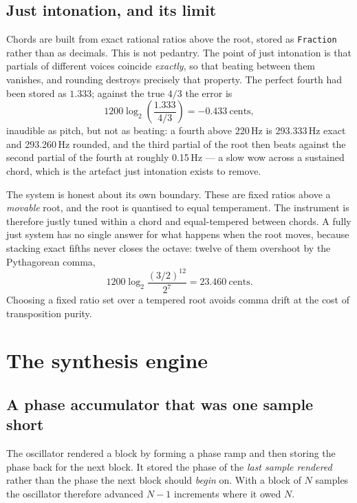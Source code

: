 \documentclass[a4paper,11pt]{article}
\newcommand{\code}[1]{\texttt{\small #1}}
\begin{document}
\subsection{Just intonation, and its limit}
\label{sec:tuning}

Chords are built from exact rational ratios above the root, stored as
\code{Fraction} rather than as decimals. This is not pedantry. The point of
just intonation is that partials of different voices coincide \emph{exactly},
so that beating between them vanishes, and rounding destroys precisely that
property. The perfect fourth had been stored as $1.333$; against the true
$4/3$ the error is
\begin{equation}
1200\log_2\!\left(\frac{1.333}{4/3}\right) = -0.433\ \text{cents},
\end{equation}
inaudible as pitch, but not as beating: a fourth above 220\,Hz is 293.333\,Hz
exact and 293.260\,Hz rounded, and the third partial of the root then beats
against the second partial of the fourth at roughly 0.15\,Hz --- a slow wow
across a sustained chord, which is the artefact just intonation exists to
remove.

The system is honest about its own boundary. These are fixed ratios above a
\emph{movable} root, and the root is quantised to equal temperament. The
instrument is therefore justly tuned within a chord and equal-tempered between
chords. A fully just system has no single answer for what happens when the root
moves, because stacking exact fifths never closes the octave: twelve of them
overshoot by the Pythagorean comma,
\begin{equation}
1200\log_2\frac{(3/2)^{12}}{2^{7}} = 23.460\ \text{cents}.
\end{equation}
Choosing a fixed ratio set over a tempered root avoids comma drift at the cost
of transposition purity.

\section{The synthesis engine}

\subsection{A phase accumulator that was one sample short}
\label{sec:phase}

The oscillator rendered a block by forming a phase ramp and then storing the
phase back for the next block. It stored the phase of the \emph{last sample
rendered} rather than the phase the next block should \emph{begin} on. With a
block of $N$ samples the oscillator therefore advanced $N-1$ increments where
it owed $N$.
\end{document}
